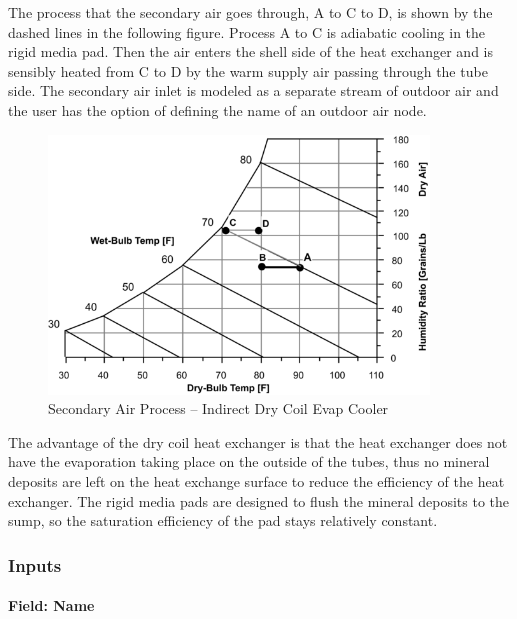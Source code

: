 The process that the secondary air goes through, A to C to D, is shown by the dashed lines in the following figure. Process A to C is adiabatic cooling in the rigid media pad. Then the air enters the shell side of the heat exchanger and is sensibly heated from C to D by the warm supply air passing through the tube side. The secondary air inlet is modeled as a separate stream of outdoor air and the user has the option of defining the name of an outdoor air node.

\begin{figure}[hbtp] %
\centering
\includegraphics[width=0.9\textwidth, height=0.9\textheight, keepaspectratio=true]{media/image420.png}
\caption{Secondary Air Process -- Indirect Dry Coil Evap Cooler \protect \label{fig:secondary-air-process-indirect-dry-coil-evap}}
\end{figure}

The advantage of the dry coil heat exchanger is that the heat exchanger does not have the evaporation taking place on the outside of the tubes, thus no mineral deposits are left on the heat exchange surface to reduce the efficiency of the heat exchanger. The rigid media pads are designed to flush the mineral deposits to the sump, so the saturation efficiency of the pad stays relatively constant.

\subsubsection{Inputs}\label{inputs-2-013}

\paragraph{Field: Name}\label{field-name-2-012}

